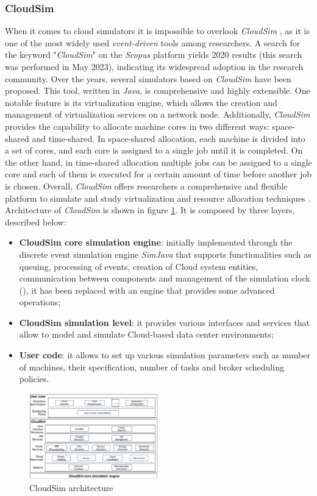 {\subsubsection{CloudSim}
When it comes to cloud simulators it is impossible to overlook \emph{CloudSim} \cite{calheiros2011cloudsim}, as it is one of the most widely used \emph{event-driven} tools among researchers. A search for the keyword "\emph{CloudSim}" on the \emph{Scopus} platform yields 2020 results (this search was performed in May 2023), indicating its widespread adoption in the research community. Over the years, several simulators based on \emph{CloudSim} have been proposed. This tool, written in \emph{Java}, is comprehensive and highly extensible.
One notable feature is its virtualization engine, which allows the creation and management of virtualization services on a network node. Additionally, \emph{CloudSim} provides the capability to allocate machine cores in two different ways: space-shared and time-shared.
In space-shared allocation, each machine is divided into a set of cores, and each core is assigned to a single job until it is completed. On the other hand, in time-shared allocation multiple jobs can be assigned to a single core and each of them is executed for a certain amount of time before another job is chosen.
Overall, \emph{CloudSim} offers researchers a comprehensive and flexible platform to simulate and study virtualization and resource allocation techniques \cite{mansouri2020cloud}.
Architecture of \emph{CloudSim} is shown in figure \ref{fig:cloudsim_arch}. It is composed by three layers, described below:
\begin{itemize}
    \item \textbf{CloudSim core simulation engine}: initially implemented through the discrete event simulation engine \emph{SimJava} that supports functionalities such as queuing, processing of events, creation of Cloud system entities, communication between components and management of the simulation clock (\cite{calheiros2011cloudsim}), it has been replaced with an engine that provides some advanced operations;
    \item \textbf{CloudSim simulation level}: it provides various interfaces and services that allow to model and simulate Cloud-based data center environments; 
    \item \textbf{User code}: it allows to set up various simulation parameters such as number of machines, their specification, number of tasks and broker scheduling policies.
\end{itemize}
\begin{figure}[h]
    \centering
    \includegraphics[width=0.5\textwidth]{chapters/images/cloudsim_arch.jpeg}
    \caption{CloudSim architecture}
    \label{fig:cloudsim_arch}
\end{figure}
}
